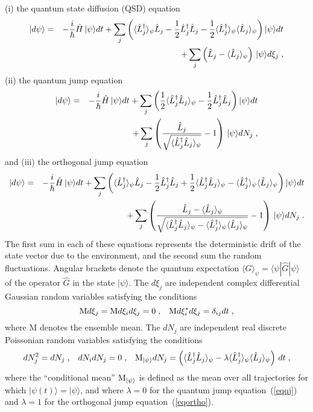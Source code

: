 \noindent(i) the quantum state diffusion (QSD) equation {\cite{Gisin1992c}}
\begin{eqnarray}
|d\psi\rangle &=& -{i\over\hbar} \hat H \,|\psi\rangle dt 
  + \sum_j\left(\langle \hat L_j^\dagger\rangle_\psi \hat L_j
  - {1\over2} \hat L_j^\dagger \hat L_j 
  - {1\over2} \langle \hat L_j^\dagger\rangle_\psi
  \langle\hat L_j\rangle_\psi\right) |\psi\rangle dt \nonumber \\
&&+\sum_j \left(\hat L_j -\langle \hat L_j\rangle_\psi\right) 
          \,|\psi\rangle d\xi_j \;,
\label{eqqsd}
\end{eqnarray}
(ii) the quantum jump equation \cite{Carmichael1993b,Dalibard1992,Gardiner1992}
\begin{eqnarray}
|d\psi\rangle &=& -{i\over\hbar} \hat H \,|\psi\rangle dt 
+ \sum_j \left(
    {1\over2} \langle \hat L_j^\dagger\hat L_j\rangle_\psi
  - {1\over2} \hat L_j^\dagger \hat L_j \right) |\psi\rangle dt \nonumber\\
&&+ \sum_j \left(
\frac{\hat L_j}{\sqrt{\langle \hat L_j^\dagger\hat L_j\rangle_\psi}}-1
\right)           \,|\psi\rangle dN_j \;,
\label{eqqj}
\end{eqnarray}
and (iii) the orthogonal jump equation \cite{Diosi1986,Breslin1995}
\begin{eqnarray}
|d\psi\rangle &=& -{i\over\hbar} \hat H \,|\psi\rangle dt 
  + \sum_j\left(\langle \hat L_j^\dagger\rangle_\psi \hat L_j
  - {1\over2} \hat L_j^\dagger \hat L_j 
  + {1\over2} \langle \hat L_j^\dagger\hat L_j\rangle_\psi 
  - \langle \hat L_j^\dagger\rangle_\psi
  \langle\hat L_j\rangle_\psi\right) |\psi\rangle dt \nonumber \\
&&+ \sum_j \left(
\frac{\hat L_j - \langle \hat L_j \rangle_\psi}
     {\sqrt{\langle \hat L_j^\dagger\hat L_j \rangle_\psi -
                 \langle \hat L_j^\dagger \rangle_\psi \langle \hat L_j \rangle_\psi}}
 -1 \right)    \,|\psi\rangle dN_j  \;.
\label{eqortho}
\end{eqnarray}
The first sum in each of these equations represents the deterministic drift of
the state vector due to the environment, and the second sum the random
fluctuations. Angular brackets denote the quantum expectation $\langle\hat
G\rangle_\psi = \langle \psi|\hat G|\psi\rangle$ of the operator $\hat G$ in
the state $|\psi\rangle$. The $d\xi_j$ are independent complex differential
Gaussian random variables satisfying the conditions
\begin{equation}
{\rm M} d\xi_j = {\rm M} d\xi_i d\xi_j = 0\;,\;\;\; 
{\rm M} d\xi_i^* d\xi_j = \delta_{ij}dt \;,
\end{equation}
where {\rm M} denotes the ensemble mean.
The $dN_j$ are independent real discrete Poissonian random variables 
satisfying the conditions
\begin{equation}
dN_j^2=dN_j \;,\;\;\; 
dN_i dN_j = 0\;,\;\;\; 
{\rm M}_{|\psi\rangle} dN_j = 
\left( \langle \hat L_j^\dagger\hat L_j\rangle_\psi 
- \lambda\langle \hat L_j^\dagger \rangle_\psi \langle \hat L_j \rangle_\psi\right) \, dt \;,
\end{equation}
where the ``conditional mean'' ${\rm M}_{|\psi\rangle}$ is defined as the mean
over all trajectories for which $|\psi(t)\rangle=|\psi\rangle$, and where
$\lambda=0$ for the quantum jump equation~(\ref{eqqj}) and $\lambda=1$ for the
orthogonal jump equation~(\ref{eqortho}).

